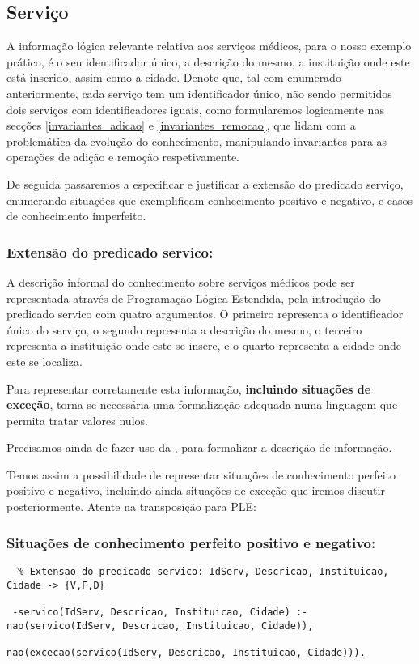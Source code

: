 \documentclass[
  oneside,
  10pt, a4paper,
  footinclude=true,
  headinclude=true,
  cleardoublepage=empty
]{scrbook}
\begin{document}
      \subsection{Serviço}
        A informação lógica relevante relativa aos serviços médicos, para o nosso exemplo prático, é o seu identificador único, a descrição do mesmo, a instituição onde este está inserido, assim como a cidade. Denote que, tal com enumerado anteriormente, cada serviço tem um identificador único, não sendo permitidos dois serviços com identificadores iguais, como formularemos logicamente nas secções \ref{invariantes_adicao} e \ref{invariantes_remocao}, que lidam com a problemática da evolução do conhecimento, manipulando invariantes para as operações de adição e remoção respetivamente.\par 
        De seguida passaremos a especificar e justificar a extensão do predicado serviço, enumerando situações que exemplificam conhecimento positivo e negativo, e casos de conhecimento imperfeito.\par 
        
        \subsubsection{\textbf{Extensão do predicado servico:}}
        
        A descrição informal do conhecimento sobre serviços médicos pode ser representada através de Programação Lógica Estendida, pela introdução do predicado servico com quatro argumentos. O primeiro representa o identificador único do serviço, o segundo representa a descrição do mesmo, o terceiro representa a instituição onde este se insere, e o quarto representa a cidade onde este se localiza.\par 
        
Para representar corretamente esta informação, \textbf{incluindo situações de exceção}, torna-se necessária uma formalização adequada  numa linguagem que permita tratar valores nulos. \par
Precisamos ainda de fazer uso da , para formalizar a descrição de informação.\par 
Temos assim a possibilidade de representar situações de conhecimento perfeito positivo e negativo, incluindo ainda situações de exceção que iremos discutir posteriormente. Atente na transposição para PLE:\par 
\subsubsection{\textbf{Situações de conhecimento perfeito positivo e negativo:}}
\label{pred_servico}
\begin{lstlisting}
  % Extensao do predicado servico: IdServ, Descricao, Instituicao, Cidade -> {V,F,D}
 
 -servico(IdServ, Descricao, Instituicao, Cidade) :- nao(servico(IdServ, Descricao, Instituicao, Cidade)),
                                                     nao(excecao(servico(IdServ, Descricao, Instituicao, Cidade))).
\end{lstlisting}
\end{document}
